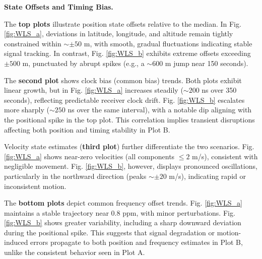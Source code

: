         \vspace{0.5em}
        \noindent \textbf{State Offsets and Timing Bias.}
        
        \noindent The \textbf{top plots} illustrate position state offsets relative to the median. 
        In Fig. \ref{fig:WLS_a}, deviations in latitude, longitude, and altitude remain tightly constrained within $\sim \pm 50$ m, with smooth, gradual fluctuations indicating stable signal tracking. 
        In contrast, Fig. \ref{fig:WLS_b} exhibits extreme offsets exceeding $\pm 500$ m, punctuated by abrupt spikes (e.g., a $\sim 600$ m jump near 150 seconds).  

        \noindent The \textbf{second plot} shows clock bias (common bias) trends. 
        Both plots exhibit linear growth, but in Fig. \ref{fig:WLS_a} increases steadily ($\sim 200$ ns over 350 seconds), reflecting predictable receiver clock drift. 
        Fig. \ref{fig:WLS_b} escalates more sharply ($\sim 250$ ns over the same interval), with a notable dip aligning with the positional spike in the top plot. 
        This correlation implies transient disruptions affecting both position and timing stability in Plot B.  

        \noindent Velocity state estimates (\textbf{third plot}) further differentiate the two scenarios. 
        Fig. \ref{fig:WLS_a} shows near-zero velocities (all components $\leq 2$ m/s), consistent with negligible movement. 
        Fig. \ref{fig:WLS_b}, however, displays pronounced oscillations, particularly in the northward direction (peaks $\sim \pm 20$ m/s), indicating rapid or inconsistent motion.  

        \noindent The \textbf{bottom plots} depict common frequency offset trends. 
        Fig. \ref{fig:WLS_a} maintains a stable trajectory near $0.8$ ppm, with minor perturbations. 
        Fig. \ref{fig:WLS_b} shows greater variability, including a sharp downward deviation during the positional spike. 
        This suggests that signal degradation or motion-induced errors propagate to both position and frequency estimates in Plot B, unlike the consistent behavior seen in Plot A.  

